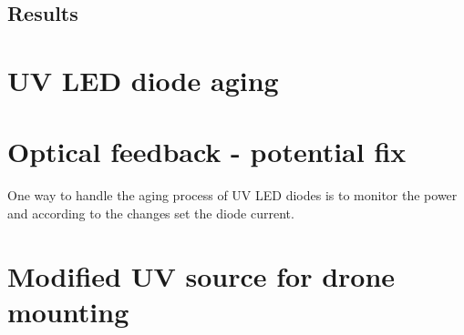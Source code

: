 \subsection{Results}

\section{UV LED diode aging}

\section{Optical feedback - potential fix}
One way to handle the aging process of UV LED diodes is to monitor the power and according to the changes set the diode current. 



\section{Modified UV source for drone mounting}



